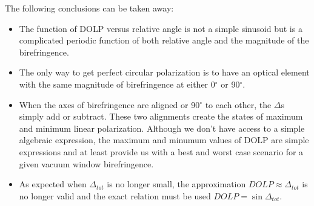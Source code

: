 \documentclass[12pt]{article}
\begin{document}
The following conclusions can be taken away:
\begin{itemize}
\item{The function of DOLP versus relative angle is not a simple sinusoid but is a complicated periodic function of both relative angle and the magnitude of the birefringence.}
\item{The only way to get perfect circular polarization is to have an optical element with the same magnitude of birefringence at either 0$^\circ$ or 90$^\circ$. }
\item{When the axes  of birefringence are aligned or 90$^\circ$ to each other, the $\Delta$s simply add or subtract. These two alignments create the states of maximum and minimum linear polarization. Although we don't have access to a simple algebraic expression, the maximum and minumum values of DOLP are simple expressions and at least provide us with a best and worst case scenario for a given vacuum window birefringence.}
\item{As expected when $\Delta_{tot}$ is no longer small, the approximation $DOLP\approx\Delta_{tot}$ is no longer valid and the exact relation must be used $DOLP=\sin\Delta_{tot}$.}
\end{itemize}
\end{document}
